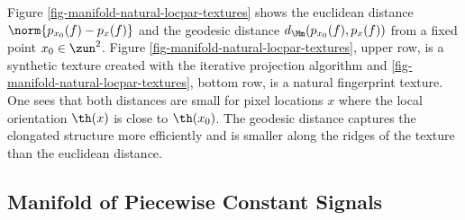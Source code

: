 Figure \ref{fig-manifold-natural-locpar-textures} shows the euclidean distance $\norm{p_{x_0}(f) - p_x(f)}$ and the geodesic distance $d_{\Mm}(p_{x_0}(f), p_x(f))$ from a fixed point $x_0 \in \zun^2$. Figure \ref{fig-manifold-natural-locpar-textures}, upper row, is a synthetic texture created with the iterative projection algorithm and \ref{fig-manifold-natural-locpar-textures}, bottom row, is a natural fingerprint texture. One sees that both distances are small for pixel locations $x$ where the local orientation $\th(x)$ is close to $\th(x_0)$. The geodesic distance captures the elongated structure more efficiently and is smaller along the ridges of the texture than the euclidean distance. 








\subsection{Manifold of Piecewise Constant Signals}
\label{sec-manifold-piecewise-cst}

